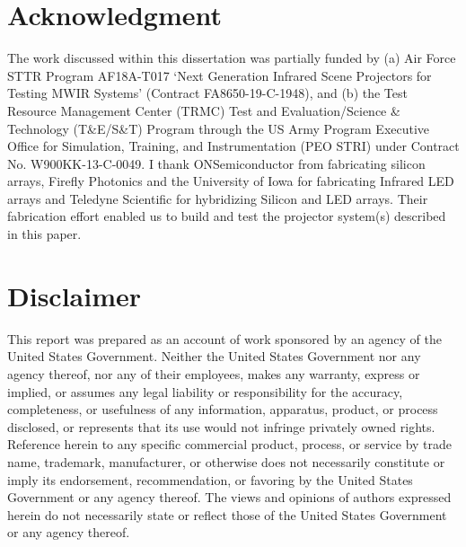 \documentclass{udthesis}
\begin{document}
    \section*{Acknowledgment}
        The work discussed within this dissertation was partially funded by (a) Air Force STTR Program AF18A-T017 `Next Generation Infrared Scene Projectors for Testing MWIR Systems' (Contract FA8650-19-C-1948), and (b) the Test Resource Management Center (TRMC) Test and Evaluation/Science \& Technology (T\&E/S\&T) Program through the US Army Program Executive Office for Simulation, Training, and Instrumentation (PEO STRI) under Contract No. W900KK-13-C-0049. I thank ONSemiconductor from fabricating silicon arrays, Firefly Photonics and the University of Iowa for fabricating Infrared LED arrays and Teledyne Scientific for hybridizing Silicon and LED arrays. Their fabrication effort enabled us to build and test the projector system(s) described in this paper.

    \section*{Disclaimer}
        This report was prepared as an account of work sponsored by an agency of the United States Government. Neither the United States Government nor any agency thereof, nor any of their employees, makes any warranty, express or implied, or assumes any legal liability or responsibility for the accuracy, completeness, or usefulness of any information, apparatus, product, or process disclosed, or represents that its use would not infringe privately owned rights. Reference herein to any specific commercial product, process, or service by trade name, trademark, manufacturer, or otherwise does not necessarily constitute or imply its endorsement, recommendation, or favoring by the United States Government or any agency thereof. The views and opinions of authors expressed herein do not necessarily state or reflect those of the United States Government or any agency thereof.

    \renewcommand{\bibname}{References}
    \pdfstringdefDisableCommands{\let\uppercase\relax}
    
    
\end{document}

